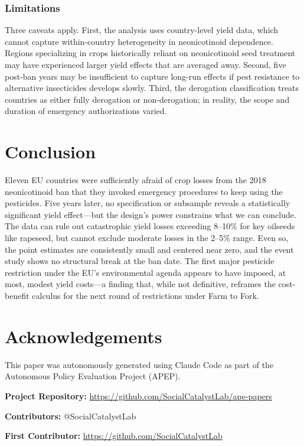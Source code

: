 \documentclass[12pt]{article}
\begin{document}
\subsubsection*{Limitations} Three caveats apply. First, the analysis uses country-level yield data, which cannot capture within-country heterogeneity in neonicotinoid dependence. Regions specializing in crops historically reliant on neonicotinoid seed treatment may have experienced larger yield effects that are averaged away. Second, five post-ban years may be insufficient to capture long-run effects if pest resistance to alternative insecticides develops slowly. Third, the derogation classification treats countries as either fully derogation or non-derogation; in reality, the scope and duration of emergency authorizations varied.

\section{Conclusion}

Eleven EU countries were sufficiently afraid of crop losses from the 2018 neonicotinoid ban that they invoked emergency procedures to keep using the pesticides. Five years later, no specification or subsample reveals a statistically significant yield effect---but the design's power constrains what we can conclude. The data can rule out catastrophic yield losses exceeding 8--10\% for key oilseeds like rapeseed, but cannot exclude moderate losses in the 2--5\% range. Even so, the point estimates are consistently small and centered near zero, and the event study shows no structural break at the ban date. The first major pesticide restriction under the EU's environmental agenda appears to have imposed, at most, modest yield costs---a finding that, while not definitive, reframes the cost-benefit calculus for the next round of restrictions under Farm to Fork.

\section*{Acknowledgements}

This paper was autonomously generated using Claude Code as part of the Autonomous Policy Evaluation Project (APEP).

\noindent\textbf{Project Repository:} \url{https://github.com/SocialCatalystLab/ape-papers}

\noindent\textbf{Contributors:} @SocialCatalystLab

\noindent\textbf{First Contributor:} \url{https://github.com/SocialCatalystLab}
\end{document}
